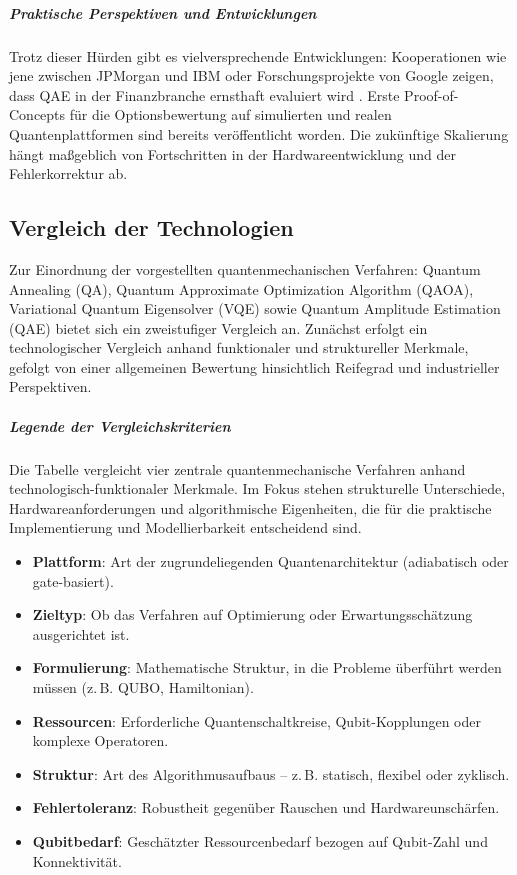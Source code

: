 \subparagraph{Praktische Perspektiven und Entwicklungen}
Trotz dieser Hürden gibt es vielversprechende Entwicklungen: Kooperationen wie jene zwischen JPMorgan und IBM oder Forschungsprojekte von Google zeigen, dass QAE in der Finanzbranche ernsthaft evaluiert wird \cite{egger2020}. Erste Proof-of-Concepts für die Optionsbewertung auf simulierten und realen Quantenplattformen sind bereits veröffentlicht worden. Die zukünftige Skalierung hängt maßgeblich von Fortschritten in der Hardwareentwicklung und der Fehlerkorrektur ab.

\subsection{Vergleich der Technologien}

Zur Einordnung der vorgestellten quantenmechanischen Verfahren: Quantum Annealing (QA), Quantum Approximate Optimization Algorithm (QAOA), Variational Quantum Eigensolver (VQE) sowie Quantum Amplitude Estimation (QAE) bietet sich ein zweistufiger Vergleich an. Zunächst erfolgt ein technologischer Vergleich anhand funktionaler und struktureller Merkmale, gefolgt von einer allgemeinen Bewertung hinsichtlich Reifegrad und industrieller Perspektiven.

\subparagraph*{Legende der Vergleichskriterien}
Die Tabelle vergleicht vier zentrale quantenmechanische Verfahren anhand technologisch-funktionaler Merkmale. Im Fokus stehen strukturelle Unterschiede, Hardwareanforderungen und algorithmische Eigenheiten, die für die praktische Implementierung und Modellierbarkeit entscheidend sind.


\begin{itemize}
    \item \textbf{Plattform}: Art der zugrundeliegenden Quantenarchitektur (adiabatisch oder gate-basiert).
    \item \textbf{Zieltyp}: Ob das Verfahren auf Optimierung oder Erwartungsschätzung ausgerichtet ist.
    \item \textbf{Formulierung}: Mathematische Struktur, in die Probleme überführt werden müssen (z.\,B. QUBO, Hamiltonian).
    \item \textbf{Ressourcen}: Erforderliche Quantenschaltkreise, Qubit-Kopplungen oder komplexe Operatoren.
    \item \textbf{Struktur}: Art des Algorithmusaufbaus – z.\,B. statisch, flexibel oder zyklisch.
    \item \textbf{Fehlertoleranz}: Robustheit gegenüber Rauschen und Hardwareunschärfen.
    \item \textbf{Qubitbedarf}: Geschätzter Ressourcenbedarf bezogen auf Qubit-Zahl und Konnektivität.
\end{itemize}

